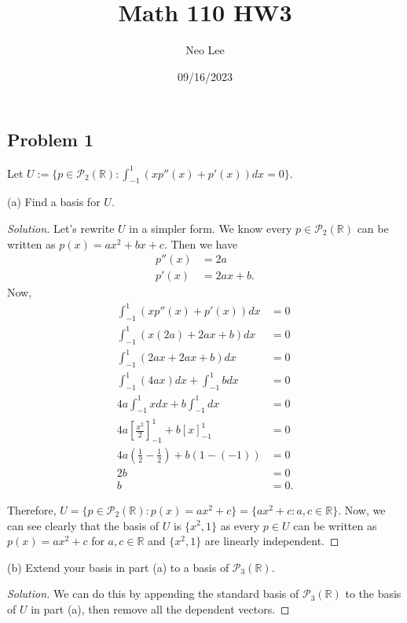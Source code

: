 \documentclass{article}
\title{Math 110 HW3}
\author{Neo Lee}
\date{09/16/2023}
\begin{document}
 

\maketitle 

\subsection*{Problem 1}
Let $U:=\{p\in\mathcal{P}_2(\mathbb{R}):\int_{-1}^{1}(xp''(x)+p'(x))dx=0\}.$
\begin{description}
    \item{(a)} Find a basis for $U$. 
    \begin{proof}[Solution]
        Let's rewrite $U$ in a simpler form. We know every $p\in\mathcal{P}_2(\mathbb{R})$ can be 
        written as $p(x)=ax^2+bx+c$. Then we have
        \begin{align*}
            p''(x) & = 2a \\
            p'(x) & = 2ax + b.
        \end{align*}
        Now, 
        \begin{align*}
            \int_{-1}^{1}(xp''(x)+p'(x))dx & = 0 \\
            \int_{-1}^{1}(x(2a)+2ax+b)dx & = 0 \\
            \int_{-1}^{1}(2ax+2ax+b)dx & = 0 \\
            \int_{-1}^{1}(4ax)dx + \int_{-1}^{1}b dx & = 0 \\
            4a\int_{-1}^{1}xdx + b\int_{-1}^{1}dx & = 0 \\
            4a\left[\frac{x^2}{2}\right]_{-1}^{1} + b\left[x\right]_{-1}^{1} & = 0 \\
            4a \left(\frac{1}{2}-\frac{1}{2}\right)+ b(1-(-1)) & = 0 \\
            2b & = 0 \\
            b & = 0.
        \end{align*}

        Therefore, $U=\{p\in\mathcal{P}_2(\mathbb{R}):p(x)=ax^2+c\} = \{ax^2+c:a,c\in\mathbb{R}\}$. 
        Now, we can see clearly that 
        the basis of $U$ is $\{x^2, 1\}$ as every $p\in U$ can be written as $p(x)=ax^2+c$ for $a,c
        \in \mathbb{R}$ and $\{x^2, 1\}$ are linearly independent.
    \end{proof}

    \newpage
    \item{(b)} Extend your basis in part (a) to a basis of ${\mathcal P}_3(\mathbb{R})$.
    \begin{proof}[Solution]
        We can do this by appending the standard basis of ${\mathcal P}_3(\mathbb{R})$ to the basis 
        of $U$ in part (a), then remove all the dependent vectors. 


\end{proof}
\end{description}
\end{document}

